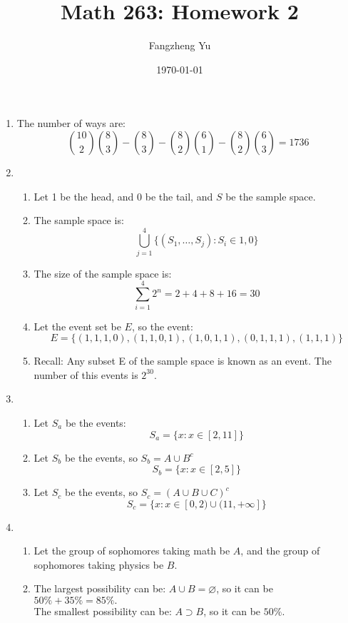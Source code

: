 \documentclass{article}
\title{Math 263: Homework 2}
\author{Fangzheng Yu}
\date{\today}
\begin{document}
    \maketitle
    \begin{enumerate}
        \item
        The number of ways are: \[\binom{10}{2} \binom{8}{3} - \binom{8}{3} - \binom{8}{2} \binom{6}{1} - \binom{8}{2} \binom{6}{3} = 1736\]
        \item 
        \begin{enumerate}
            \item[]
            Let 1 be the head, and 0 be the tail, and $S$ be the sample space.
            \item 
            The sample space is: \[\bigcup\limits_{j = 1} ^ {4}\{(S_1,\ldots, S_j): S_i \in {1, 0}\}\]
            \item 
            The size of the sample space is: \[\sum_{i = 1} ^ {4} 2 ^ n = 2 + 4 + 8 + 16 = 30\]
            \item 
            Let the event set be $E$, so the event: \[E = \{(1, 1, 1, 0), (1, 1, 0, 1), (1, 0, 1, 1), (0, 1, 1, 1), (1, 1, 1)\}\]
            \item 
            Recall: Any subset E of the sample space is known as an event.
            The number of this events is $2 ^ {30}$.
        \end{enumerate}
        \item 
        \begin{enumerate}
            \item 
            Let $S_a$ be the events: \[S_a = \{x: x \in [2, 11]\}\]
            \item 
            Let $S_b$ be the events, so $S_b = A \cup B ^ {c}$ \[S_b = \{x: x \in [2, 5]\}\]
            \item 
            Let $S_c$ be the events, so $S_c = (A \cup B \cup C) ^ {c}$ \[S_c = \{x: x \in [0, 2) \cup (11, +\infty]\}\]
        \end{enumerate}
        \item 
        \begin{enumerate}
            \item[]
            Let the group of sophomores taking math be $A$, and the group of sophomores taking physics be $B$.
            \item 
            The largest possibility can be: $A \cup B = \varnothing$, so it can be $50\% + 35\% = 85\%.$\\
            The smallest possibility can be: $A \supset B$, so it can be $50\%$.

\end{enumerate}
\end{enumerate}
\end{document}
